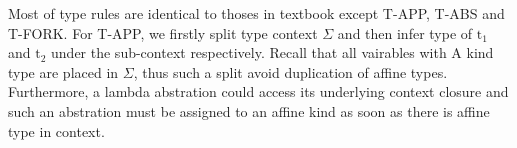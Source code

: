 \documentclass[10pt]{article}
\newcommand{\xto}{\xrightarrow}
\newcommand{\context}{\Gamma;\Sigma\mid\Phi}
\theoremstyle{definition}\newtheorem*{theorem}{Theorem}
\theoremstyle{definition}\newtheorem*{definition}{Definition}
\theoremstyle{definition}\newtheorem*{lemma}{Lemma}
\begin{document}

    Most of type rules are identical to thoses in textbook except T-APP, T-ABS and T-FORK. For T-APP, we firstly split type context $\Sigma$ and then infer type of $\mathrm{t_1}$ and $\mathrm{t_2}$
    under the sub-context respectively. Recall that all vairables with $\mathrm{A}$ kind type are placed in $\Sigma$, thus such a split avoid duplication of affine types.
    Furthermore, a lambda abstration could access its underlying context closure and such an abstration must be assigned to an affine kind as soon as there is affine type in context.
\end{document}
